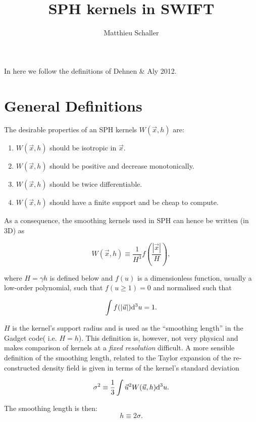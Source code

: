 \documentclass[a4paper]{mnras}
\title{SPH kernels in SWIFT}
\author{Matthieu Schaller}
\begin{document}
\maketitle

In here we follow the definitions of Dehnen \& Aly 2012.

\section{General Definitions}

The desirable properties of an SPH kernels $W(\vec{x},h)$ are:
\begin{enumerate}
\item $W(\vec{x},h)$ should be isotropic in $\vec{x}$.
\item $W(\vec{x},h)$ should be positive and decrease monotonically.
\item $W(\vec{x},h)$ should be twice differentiable.
\item $W(\vec{x},h)$ should have a finite support and be cheap to
  compute.
\end{enumerate}

As a consequence, the smoothing kernels used in SPH can
hence be written (in 3D) as

\begin{equation}
 W(\vec{x},h) \equiv \frac{1}{H^3}f\left(\frac{|\vec{x}|}{H}\right),
\end{equation}

where $H=\gamma h$ is defined below and $f(u)$ is a dimensionless
function, usually a low-order polynomial, such that $f(u \geq 1) = 0$
and normalised such that

\begin{equation}
  \int f(|\vec{u}|){\rm d}^3u = 1.
\end{equation}

$H$ is the kernel's support radius and is used as the ``smoothing
length'' in the Gadget code( {i.e.} $H=h$). This definition is,
however, not very physical and makes comparison of kernels at a
\emph{fixed resolution} difficult. A more sensible definition of the
smoothing length, related to the Taylor expansion of the
re-constructed density field is given in terms of the kernel's
standard deviation

\begin{equation}
  \sigma^2 \equiv \frac{1}{3}\int \vec{u}^2 W(\vec{u},h) {\rm d}^3u.
  \label{eq:sph:sigma}
\end{equation}

The smoothing length is then:
\begin{equation}
  h\equiv2\sigma.
    \label{eq:sph:h}
\end{equation}
\end{document}
